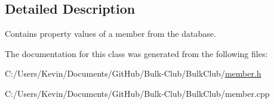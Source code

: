 \subsection{Detailed Description}
Contains property values of a member from the database. 

The documentation for this class was generated from the following files\+:\begin{DoxyCompactItemize}
\item 
C\+:/\+Users/\+Kevin/\+Documents/\+Git\+Hub/\+Bulk-\/\+Club/\+Bulk\+Club/\mbox{\hyperlink{member_8h}{member.\+h}}\item 
C\+:/\+Users/\+Kevin/\+Documents/\+Git\+Hub/\+Bulk-\/\+Club/\+Bulk\+Club/member.\+cpp\end{DoxyCompactItemize}
